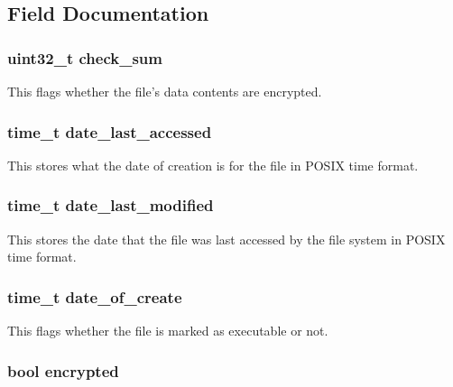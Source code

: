 \subsection{Field Documentation}
\hypertarget{structinode_a609a9abb9ba167b63027aad986198118}{
\subsubsection[{check\-\_\-sum}]{\setlength{\rightskip}{0pt plus 5cm}uint32\-\_\-t check\-\_\-sum}}\label{structinode_a609a9abb9ba167b63027aad986198118}
This flags whether the file's data contents are encrypted. \hypertarget{structinode_a3b1b10b96addbc06de562360c44d44c2}{
\subsubsection[{date\-\_\-last\-\_\-accessed}]{\setlength{\rightskip}{0pt plus 5cm}time\-\_\-t date\-\_\-last\-\_\-accessed}}\label{structinode_a3b1b10b96addbc06de562360c44d44c2}
This stores what the date of creation is for the file in P\-O\-S\-I\-X time format. \hypertarget{structinode_a6c79d9f7a8c07080347292608eff8cbd}{
\subsubsection[{date\-\_\-last\-\_\-modified}]{\setlength{\rightskip}{0pt plus 5cm}time\-\_\-t date\-\_\-last\-\_\-modified}}\label{structinode_a6c79d9f7a8c07080347292608eff8cbd}
This stores the date that the file was last accessed by the file system in P\-O\-S\-I\-X time format. \hypertarget{structinode_a6fcc067af656e07c0d52cb7890be4a1f}{
\subsubsection[{date\-\_\-of\-\_\-create}]{\setlength{\rightskip}{0pt plus 5cm}time\-\_\-t date\-\_\-of\-\_\-create}}\label{structinode_a6fcc067af656e07c0d52cb7890be4a1f}
This flags whether the file is marked as executable or not. \hypertarget{structinode_a8a32018f1892e247f08ea9a91f5505e6}{
\subsubsection[{encrypted}]{\setlength{\rightskip}{0pt plus 5cm}bool encrypted}}\label{structinode_a8a32018f1892e247f08ea9a91f5505e6}
